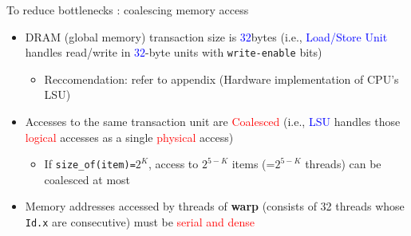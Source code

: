 \documentclass[dvipdfmx, 11pt, aspectratio=169]{beamer}   %
\begin{document}
\begin{frame}[fragile]{To reduce bottlenecks : coalescing memory access}
  \begin{itemize}
    \item DRAM (global memory) transaction size is \textcolor{blue}{$32$}bytes (i.e., \textcolor{blue}{Load/Store Unit} handles read/write in \textcolor{blue}{$32$}-byte units with \lstinline|write-enable| bits)
    \begin{itemize}
      \item Reccomendation: refer to appendix (Hardware implementation of CPU's LSU)
    \end{itemize}
    \item Accesses to the same transaction unit  are \textcolor{red}{Coalesced} (i.e., \textcolor{blue}{LSU} handles those \textcolor{red}{logical} accesses as a single \textcolor{red}{physical} access)
    \begin{itemize}
      \item If \lstinline|size_of(item)=|$2^{K}$, access to $2^{5-K}$ items (=$2^{5-K}$ threads) can be coalesced at most
    \end{itemize}
    \item Memory addresses accessed by threads of \textbf{warp} (consists of 32 threads whose \lstinline|Id.x| are consecutive) must be \textcolor{red}{serial and dense}
  \end{itemize}
\end{frame}
\end{document}
